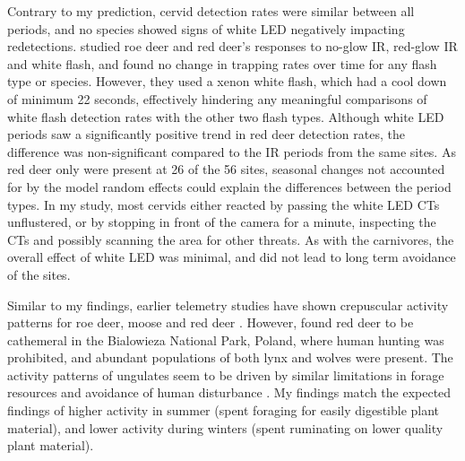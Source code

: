 Contrary to my prediction, cervid detection rates were similar between all periods, and no species showed signs of white LED negatively impacting redetections.
\textcite{Henrich2020} studied roe deer and red deer's responses to no-glow IR, red-glow IR and white flash, and found no change in trapping rates over time for any flash type or species. However, they used a xenon white flash, which had a cool down of minimum 22 seconds, effectively hindering any meaningful comparisons of white flash detection rates with the other two flash types. 
Although white LED periods saw a significantly positive trend in red deer detection rates, the difference was non-significant compared to the IR periods from the same sites. As red deer only were present at 26 of the 56 sites, seasonal changes not accounted for by the model random effects could explain the differences between the period types.
In my study, most cervids either reacted by passing the white LED CTs unflustered, or by stopping in front of the camera for a minute, inspecting the CTs and possibly scanning the area for other threats. 
As with the carnivores, the overall effect of white LED was minimal, and did not lead to long term avoidance of the sites. 

Similar to my findings, earlier telemetry studies have shown crepuscular activity patterns for roe deer, moose \autocite{Cederlund1989} and red deer \autocite{Godvik2009}.
However, \textcite{Kamler2007} found red deer to be cathemeral in the Bialowieza National Park, Poland, where human hunting was prohibited, and abundant populations of both lynx and wolves were present. 
The activity patterns of ungulates seem to be driven by similar limitations in forage resources and avoidance of human disturbance \autocite{Cederlund1989, Kamler2007}. 
My findings match the expected findings of higher activity in summer (spent foraging for easily digestible plant material), and lower activity during winters (spent ruminating on lower quality plant material).

